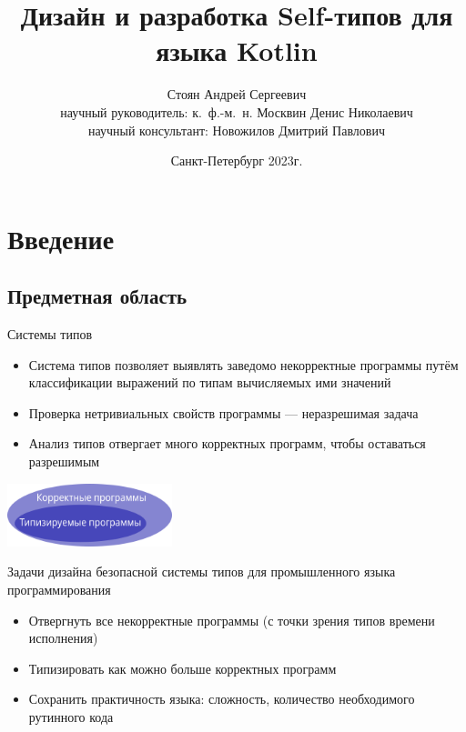 \documentclass[usenames, dvipsnames]{beamer}
\author[Андрей Стоян]{Стоян Андрей Сергеевич \\ {\footnotesize научный руководитель: к.~ф.-м.~н.} Москвин Денис Николаевич \\ {\footnotesize научный консультант:} Новожилов Дмитрий Павлович}
\institute[ИТМО/SE]{Университет ИТМО\\Разработка программного обеспечения/Software engineering}
\title[Self-типы для языка Kotlin]{Дизайн и разработка Self-типов для языка Kotlin}
\date{Санкт-Петербург 2023г.}
\begin{document}
    \setcounter{framenumber}{-1}

    \maketitle


    \section{Введение}


    \subsection{Предметная область}

    \begin{frame}{Системы типов}
        \begin{itemize}
            \item Система типов позволяет выявлять заведомо некорректные программы путём классификации выражений по типам вычисляемых ими значений
            \item Проверка нетривиальных свойств программы --- неразрешимая задача
            \item Анализ типов отвергает много корректных программ, чтобы оставаться разрешимым
        \end{itemize}

        \begin{center}
            \includegraphics[width=0.36\textwidth]{fig/types}
        \end{center}

        \begin{block}{Задачи дизайна безопасной системы типов для промышленного языка программирования}
            \begin{itemize}
                \item Отвергнуть все некорректные программы (с точки зрения типов времени исполнения)
                \item Типизировать как можно больше корректных программ
                \item Сохранить практичность языка: сложность, количество необходимого рутинного кода
            \end{itemize}
        \end{block}
    \end{frame}
\end{document}
